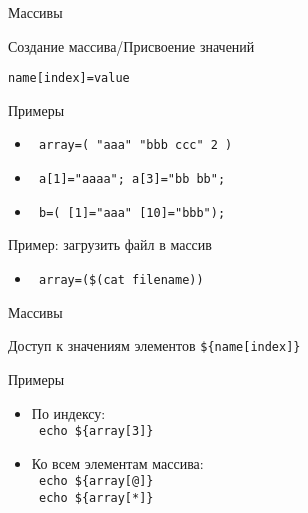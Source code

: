 \begin{frame}[fragile]{Массивы}


	\bigskip

	\begin{block}{Создание массива/Присвоение значений}

		{\tt name[index]=value}
	\end{block}
	
	\begin{block}{Примеры}
		\begin{itemize}
			\item \verb+ array=( "aaa" "bbb ccc" 2 ) +
			\item \verb+ a[1]="aaaa"; a[3]="bb bb";   +
			\item \verb+ b=( [1]="aaa" [10]="bbb"); +
		\end{itemize}
	\end{block}

	\pause

	\begin{block}{Пример: загрузить файл в массив}
		\begin{itemize}
			\item \verb+ array=($(cat filename)) +
		\end{itemize}
	\end{block}

\end{frame}

\begin{frame}[fragile]{Массивы}
	\begin{block}{Доступ к значениям элементов}
		{\tt \$\{name[index]\}}
	\end{block}
	
	\begin{block}{Примеры}
		\begin{itemize}
			\item По индексу: \\
				\verb+ echo ${array[3]} +
			\item Ко всем элементам массива: \\
				\verb+ echo ${array[@]} + \\
				\verb+ echo ${array[*]} + 
		\end{itemize}
	\end{block}
\end{frame}

